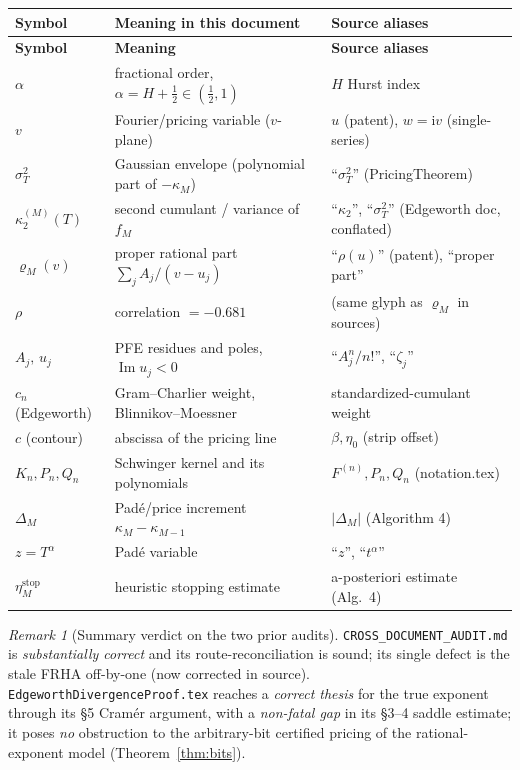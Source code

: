 \documentclass[11pt]{article}
\DeclareMathOperator{\Imag}{Im}
\newcommand{\Ii}{\mathrm{i}}
\theoremstyle{plain}
\theoremstyle{definition}
\theoremstyle{remark}
\newtheorem*{remarknote}{Remark}
\begin{document}
{\small
\begin{longtable}{@{}>{\raggedright\arraybackslash}p{}
                     >{\raggedright\arraybackslash}p{}
                     >{\raggedright\arraybackslash}p{}@{}}
\toprule
\textbf{Symbol} & \textbf{Meaning in this document} & \textbf{Source aliases}\\
\midrule
\endfirsthead
\toprule
\textbf{Symbol} & \textbf{Meaning} & \textbf{Source aliases}\\
\midrule
\endhead
\bottomrule
\endfoot
$\alpha$ & fractional order, $\alpha=H+\tfrac12\in(\tfrac12,1)$ & $H$ Hurst index\\
$v$ & Fourier/pricing variable ($v$-plane) & $u$ (patent), $w=\Ii v$ (single-series)\\
$\sigma_T^2$ & Gaussian envelope (polynomial part of $-\kappa_M$) & ``$\sigma_T^2$'' (PricingTheorem)\\
$\kappa_2^{(M)}(T)$ & second cumulant / variance of $f_M$ & ``$\kappa_2$'', ``$\sigma_T^2$'' (Edgeworth doc, conflated)\\
$\varrho_M(v)$ & proper rational part $\sum_j A_j/(v-u_j)$ & ``$\rho(u)$'' (patent), ``proper part''\\
$\rho$ & correlation $=-0.681$ & (same glyph as $\varrho_M$ in sources)\\
$A_j,\,u_j$ & PFE residues and poles, $\Imag u_j<0$ & ``$A_j^n/n!$'', ``$\zeta_j$''\\
$c_n$ (Edgeworth) & Gram--Charlier weight, Blinnikov--Moessner & standardized-cumulant weight\\
$c$ (contour) & abscissa of the pricing line & $\beta,\eta_0$ (strip offset)\\
$K_n,P_n,Q_n$ & Schwinger kernel and its polynomials & $F^{(n)},P_n,Q_n$ (notation.tex)\\
$\Delta_M$ & Padé/price increment $\kappa_M-\kappa_{M-1}$ & $|\Delta_M|$ (Algorithm 4)\\
$z=T^\alpha$ & Padé variable & ``$z$'', ``$t^\alpha$''\\
$\eta_M^{\mathrm{stop}}$ & heuristic stopping estimate & a-posteriori estimate (Alg.\ 4)\\
\end{longtable}
}

\begin{remarknote}[Summary verdict on the two prior audits]
\texttt{CROSS\_DOCUMENT\_AUDIT.md} is \emph{substantially correct} and its
route-reconciliation is sound; its single defect is the stale FRHA off-by-one
(now corrected in source). \texttt{EdgeworthDivergenceProof.tex} reaches a
\emph{correct thesis} for the true exponent through its \S5 Cramér argument, with a
\emph{non-fatal gap} in its \S3--4 saddle estimate; it poses \emph{no} obstruction
to the arbitrary-bit certified pricing of the rational-exponent model
(Theorem~\ref{thm:bits}).
\end{remarknote}
\end{document}
